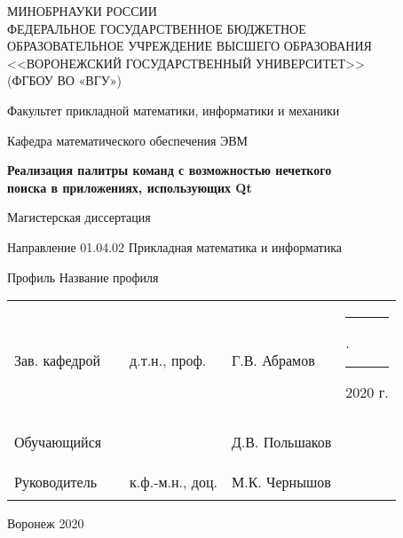 \newcommand{\disserDepartment}{математического обеспечения ЭВМ}
\newcommand{\disserProgram}{01.04.02 Прикладная математика и информатика}
\newcommand{\disserTitle}{Реализация палитры команд с возможностью нечеткого \\ поиска в
    приложениях, использующих Qt}
\newcommand{\disserProfile}{Название профиля}

\newcommand{\disserHeadOfDepStatus}{д.т.н., проф.}
\newcommand{\disserHeadOfDepName}{Г.В. Абрамов}
\newcommand{\disserStudent}{Д.В. Польшаков}

\newcommand{\disserSupervisorStatus}{к.ф.-м.н., доц.}
\newcommand{\disserSupervisorName}{М.К. Чернышов}

\thispagestyle{empty}
\begin{center}
МИНОБРНАУКИ РОССИИ \\
ФЕДЕРАЛЬНОЕ ГОСУДАРСТВЕННОЕ БЮДЖЕТНОЕ \\
ОБРАЗОВАТЕЛЬНОЕ УЧРЕЖДЕНИЕ ВЫСШЕГО ОБРАЗОВАНИЯ \\
<<ВОРОНЕЖСКИЙ ГОСУДАРСТВЕННЫЙ УНИВЕРСИТЕТ>> \\
(ФГБОУ ВО «ВГУ»)

\vspace{2ex}

Факультет прикладной математики, информатики и механики

\vspace{2ex}

Кафедра \disserDepartment{}

\vspace{3.5cm}
\textbf{\disserTitle}

\vspace{1cm}
Магистерская диссертация

\vspace{0.5cm}
Направление \disserProgram{}

\vspace{0.5cm}
Профиль \disserProfile{}

\vspace{4cm}

\begin{center}
  \begin{tabular}{ l l l l l }
    Зав. кафедрой & \rule{25mm}{0.1mm} & \disserHeadOfDepStatus{}  & \disserHeadOfDepName{} & \rule{7mm}{0.1mm}.\rule{7mm}{0.1mm} 2020 г.  \\
    & \\
    Обучающийся   & \rule{25mm}{0.1mm} &                           & \disserStudent{} & \\
    & \\
    Руководитель  & \rule{25mm}{0.1mm} & \disserSupervisorStatus{} & \disserSupervisorName{} & \\
  \end{tabular}
\end{center}

\vspace{3cm}
Воронеж 2020
\end{center}
